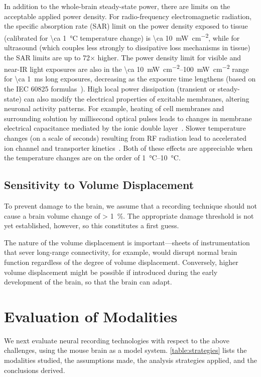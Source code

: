 In addition to the whole-brain steady-state power, there are limits on the acceptable applied power density.
For radio-frequency electromagnetic radiation, the specific absorption rate (SAR) limit on the power density exposed to tissue (calibrated for \SI{\ca 1}{\celsius} temperature change) is  \SI{\ca 10}{\milli\watt\per\centi\meter\squared}, while for ultrasound (which couples less strongly to dissipative loss mechanisms in tissue) the SAR limits are up to 72$\times$ higher.
The power density limit for visible and near-IR light exposures are also in the \SIrange{\ca 10}{100}{\milli\watt\per\centi\meter\squared} range for \SI{\ca 1}{\milli\second} long exposures, decreasing as the exposure time lengthens (based on the IEC 60825 formulas~\cite{iec60825}).
High local power dissipation (transient or steady-state) can also modify the electrical properties of excitable membranes, altering neuronal activity patterns.
For example, heating of cell membranes and surrounding solution by millisecond optical pulses leads to changes in membrane electrical capacitance mediated by the ionic double layer~\cite{shapiro12}.
Slower temperature changes (on a scale of seconds) resulting from RF radiation lead to accelerated ion channel and transporter kinetics~\cite{shapiro13}.
Both of these effects are appreciable when the temperature changes are on the order of \SIrange{1}{10}{\degreeCelsius}.

\subsection{Sensitivity to Volume Displacement}

To prevent damage to the brain, we assume that a recording technique should not cause a brain volume change of \SI{> 1}{\percent}. The appropriate damage threshold is not yet established, however, so this constitutes a first guess.

The nature of the volume displacement is important---sheets of instrumentation that sever long-range connectivity, for example, would disrupt normal brain function regardless of the degree of volume displacement.
Conversely, higher volume displacement might be possible if introduced during the early development of the brain, so that the brain can adapt.

\section{Evaluation of Modalities}

We next evaluate neural recording technologies with respect to the above challenges, using the mouse brain as a model system.
\autoref{table:strategies} lists the modalities studied, the assumptions made, the analysis strategies applied, and the conclusions derived.

